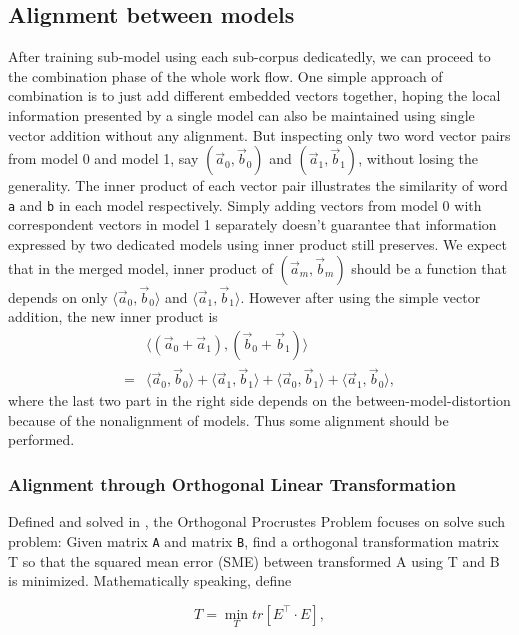 \subsection{Alignment between models}
  After training sub-model using each sub-corpus dedicatedly, we can proceed to the combination phase of the whole work flow. One simple approach of combination is to just add different embedded vectors together, hoping the local information presented by a single model can also be maintained using single vector addition without any alignment. But inspecting only two word vector pairs from model 0 and model 1, say $(\vec{a}_0, \vec{b}_0)$ and $(\vec{a}_1, \vec{b}_1)$, without losing the generality. The inner product of each vector pair illustrates the similarity of word \verb|a| and \verb|b| in each model respectively. Simply adding vectors from model 0 with correspondent vectors in model 1 separately doesn't guarantee that information expressed by two dedicated models using inner product still preserves. We expect that in the merged model, inner product of $(\vec{a}_m,\vec{b}_m)$ should be a function that depends on only $\langle\vec{a}_0,\vec{b}_0\rangle$ and $\langle\vec{a}_1, \vec{b}_1\rangle$. However after using the simple vector addition, the new inner product is
  \begin{equation}\label{eq:inner_product}\begin{split}
   &\langle(\vec{a}_0+\vec{a}_1), (\vec{b}_0+\vec{b}_1)\rangle\\
   = &\langle\vec{a}_0,\vec{b}_0\rangle+
     \langle\vec{a}_1,\vec{b}_1\rangle+
     \langle\vec{a}_0,\vec{b}_1\rangle+
     \langle\vec{a}_1,\vec{b}_0\rangle,
  \end{split}\end{equation}
  where the last two part in the right side depends on the between-model-distortion because of the nonalignment of models. Thus some alignment should be performed.

  \subsubsection{Alignment through Orthogonal Linear Transformation}
  Defined and solved in \cite{schonemann1966generalized}, the Orthogonal Procrustes Problem focuses on solve such problem: Given matrix \verb|A| and matrix \verb|B|, find a orthogonal transformation matrix T so that the squared mean error (SME) between transformed A using T and B is minimized. Mathematically speaking, define
  
  \begin{equation}
    T = \min_{T}tr[E^\intercal \cdot E],
  \end{equation}
  

